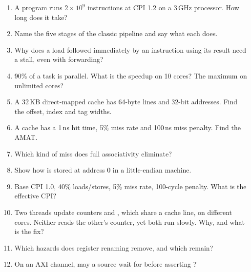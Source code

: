 \begin{enumerate}
  \item A program runs $2\times10^9$ instructions at CPI 1.2 on a 3\,GHz processor. How long does it take?
  \item Name the five stages of the classic pipeline and say what each does.
  \item Why does a load followed immediately by an instruction using its result need a stall, even with forwarding?
  \item 90\% of a task is parallel. What is the speedup on 10 cores? The maximum on unlimited cores?
  \item A 32\,KB direct-mapped cache has 64-byte lines and 32-bit addresses. Find the offset, index and tag widths.
  \item A cache has a 1\,ns hit time, 5\% miss rate and 100\,ns miss penalty. Find the AMAT.
  \item Which kind of miss does full associativity eliminate?
  \item Show how  is stored at address 0 in a little-endian machine.
  \item Base CPI 1.0, 40\% loads/stores, 5\% miss rate, 100-cycle penalty. What is the effective CPI?
  \item Two threads update counters  and , which share a cache line, on different cores. Neither reads the other's counter, yet both run slowly. Why, and what is the fix?
  \item Which hazards does register renaming remove, and which remain?
  \item On an AXI channel, may a source wait for  before asserting ?
\end{enumerate}

